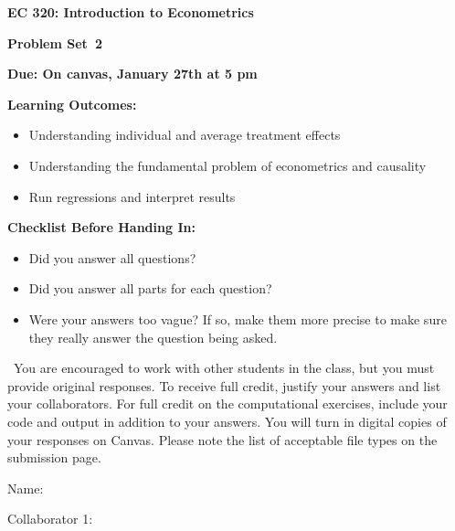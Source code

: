 \documentclass[11pt]{article}
\begin{document}
\begin{onehalfspacing}

\begin{center}
\textbf{EC 320: Introduction to Econometrics} \bigskip

\textbf{Problem Set\bigskip\ 2}
\bigskip
\end{center}



\noindent \textbf{Due: On canvas, January 27th at 5 pm}

\bigskip

\noindent \textbf{Learning Outcomes:}
\begin{itemize}
\item Understanding individual and average treatment effects
\item Understanding the fundamental problem of econometrics and causality
\item Run regressions and interpret results
\end{itemize}

\bigskip


\noindent \textbf{Checklist Before Handing In:}
\begin{itemize}
\item Did you answer all questions?
\item Did you answer all parts for each question?
\item Were your answers too vague? If so, make them more precise to make sure they really answer the question being asked.
\end{itemize}

\bigskip

\ You are encouraged to work with other students in the class, but you must provide original responses. To receive full credit, justify your answers and list your collaborators. For full credit on the computational exercises, include your code and output in addition to your answers. You will turn in digital copies of your responses on Canvas. Please note the list of acceptable file types on the submission page.  \\
\vspace{0.1in}

Name: 			\\
\vspace{0.1in}

Collaborator 1: \\

\vspace{0.1in}


\end{onehalfspacing}
\end{document}
